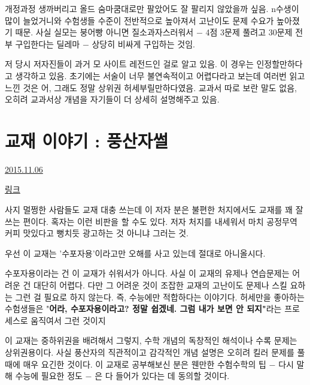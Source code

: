 개정과정 생까버리고 올드 숨마쿰대로만 팔았어도 잘 팔리지 않았을까 싶음.
n수생이 많이 늘었거니와 수험생들 수준이 전반적으로 높아져서 고난이도 문제 수요가 높아졌기 때문.
사실 실모는 붕어빵 아니면 질소과자스러워서 $-$ 4점 3문제 풀려고 30문제 전부 구입한다는 딜레마 $-$ 상당히 비싸게 구입하는 것임.
\vspace{5mm}

저 당시 저자진들이 과거 모 사이트 레전드인 걸로 알고 있음. 이 경우는 인정할만하다고 생각하고 있음.
초기에는 서술이 너무 불연속적이고 어렵다라고 보는데 여러번 읽고 느낀 것은 어, 그래도 정말 상위권 허세부릴만하다였음.
교과서 따로 보란 말도 없음, 오히려 교과서상 개념을 자기들이 더 상세히 설명해주고 있음.
\vspace{5mm}



\section{교재 이야기 : 풍산자썰}
\href{https://www.kockoc.com/Apoc/465841}{2015.11.06}

\vspace{5mm}

\href{http://news.naver.com/main/read.nhn?mode=LSD&mid=sec&sid1=001&oid=036&aid=0000004714}{링크}
\vspace{5mm}

사지 멀쩡한 사람들도 교재 대충 쓰는데 이 저자 분은 불편한 처지에서도 교재를 꽤 잘 쓰는 편이다.
혹자는 이런 비판을 할 수도 있다. 저자 처지를 내세워서 마치 공정무역 커피 맛있다고 뻥치듯 광고하는 것 아니냐 그러는 것.
\vspace{5mm}

우선 이 교재는 '수포자용'이라고만 오해를 사고 있는데 절대로 아니올시다.
\vspace{5mm}

수포자용이라는 건 이 교재가 쉬워서가 아니다. 사실 이 교재의 유제나 연습문제는 어려운 건 대단히 어렵다.
다만 그 어려운 것이 조잡한 교재의 고난이도 문제나 스킬 요하는 그런 걸 필요로 하지 않는다. 즉, 수능에만 적합하다는 이야기다.
허세만을 좋아하는 수험생들은 "\textbf{어라, 수포자용이라고? 정말 쉽겠네. 그럼 내가 보면 안 되지"}라는 프로세스로 움직여서 그런 것이지
\vspace{5mm}

이 교재는 중하위권을 배려해서 그렇지,
수학 개념의 독창적인 해석이나 수록 문제는 상위권용이다.
사실 풍산자의 직관적이고 감각적인 개념 설명은 오히려 킬러 문제를 풀 때에 매우 요긴한 것이다.
이 교재로 공부해보신 분은 웬만한 수험수학의 팁 $-$ 다시 말해 수능에 필요한 정도 $-$ 은 다 들어가 있다는 데 동의할 것이다.
\vspace{5mm}

